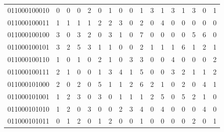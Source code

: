\documentclass[10pt,a4paper]{article}
\begin{document}
\begin{longtable}{ |c|c|c|c|c|c|c|c|c|c|c|c|c|c|c|c|c| }
    011000100010              & 0                            & 0                                & 0                            & 2                              & 0   & 1   & 0   & 0   & 1   & 3   & 1   & 3   & 1   & 3   & 0   & 1   \\
    011000100011              & 1                            & 1                                & 1                            & 1                              & 2   & 2   & 3   & 0   & 2   & 0   & 4   & 0   & 0   & 0   & 0   & 0   \\
    011000100100              & 3                            & 0                                & 3                            & 2                              & 0   & 3   & 1   & 0   & 7   & 0   & 0   & 0   & 0   & 5   & 6   & 0   \\
    011000100101              & 3                            & 2                                & 5                            & 3                              & 1   & 1   & 0   & 0   & 2   & 1   & 1   & 1   & 6   & 1   & 2   & 1   \\
    011000100110              & 1                            & 0                                & 1                            & 0                              & 2   & 1   & 0   & 3   & 3   & 0   & 0   & 4   & 0   & 0   & 0   & 2   \\
    011000100111              & 2                            & 1                                & 0                            & 0                              & 1   & 3   & 4   & 1   & 5   & 0   & 0   & 3   & 2   & 1   & 1   & 2   \\
    011000101000              & 2                            & 0                                & 2                            & 0                              & 5   & 1   & 1   & 2   & 6   & 2   & 1   & 0   & 2   & 0   & 4   & 1   \\
    011000101001              & 1                            & 2                                & 3                            & 0                              & 3   & 0   & 1   & 1   & 1   & 2   & 5   & 0   & 5   & 2   & 1   & 0   \\
    011000101010              & 1                            & 2                                & 0                            & 3                              & 0   & 0   & 2   & 3   & 4   & 0   & 4   & 0   & 0   & 0   & 4   & 0   \\
    011000101011              & 0                            & 1                                & 2                            & 0                              & 1   & 2   & 0   & 0   & 1   & 0   & 0   & 0   & 0   & 2   & 0   & 1   \\

\end{longtable}
\end{document}
